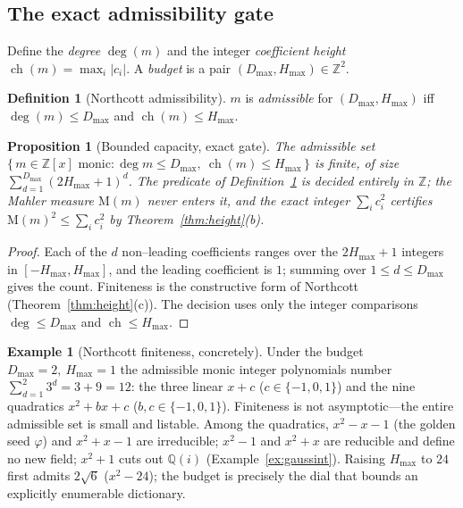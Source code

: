 \documentclass[11pt]{article}
\theoremstyle{plain}
\newtheorem{proposition}[theorem]{Proposition}
\theoremstyle{definition}
\newtheorem{definition}[theorem]{Definition}
\newtheorem{example}[theorem]{Example}
\theoremstyle{remark}
\newcommand{\Q}{\mathbb{Q}}
\newcommand{\Z}{\mathbb{Z}}
\newcommand{\Mah}{\mathrm{M}}
\begin{document}
\subsection{The exact admissibility gate}
Define the \emph{degree} $\deg(m)$ and the integer \emph{coefficient height}
$\operatorname{ch}(m)=\max_i|c_i|$. A \emph{budget} is a pair $(D_{\max},H_{\max})\in\Z^2$.

\begin{definition}[Northcott admissibility]\label{def:admissible}
$m$ is \emph{admissible} for $(D_{\max},H_{\max})$ iff $\deg(m)\le D_{\max}$ and
$\operatorname{ch}(m)\le H_{\max}$.
\end{definition}

\begin{proposition}[Bounded capacity, exact gate]\label{prop:cap}
The admissible set $\{\,m\in\Z[x]\text{ monic}: \deg m\le D_{\max},\ \operatorname{ch}(m)\le H_{\max}\,\}$ is
finite, of size $\sum_{d=1}^{D_{\max}}(2H_{\max}+1)^{d}$. The predicate of
Definition~\ref{def:admissible} is decided entirely in $\Z$; the Mahler measure $\Mah(m)$ never enters it,
and the exact integer $\sum_i c_i^2$ certifies $\Mah(m)^2\le\sum_i c_i^2$ by Theorem~\ref{thm:height}(b).
\end{proposition}
\begin{proof}
Each of the $d$ non--leading coefficients ranges over the $2H_{\max}+1$ integers in
$[-H_{\max},H_{\max}]$, and the leading coefficient is $1$; summing over $1\le d\le D_{\max}$ gives the count.
Finiteness is the constructive form of Northcott (Theorem~\ref{thm:height}(c)). The decision uses only the
integer comparisons $\deg\le D_{\max}$ and $\operatorname{ch}\le H_{\max}$.
\end{proof}

\begin{example}[Northcott finiteness, concretely]\label{ex:northcott}
Under the budget $D_{\max}=2,\ H_{\max}=1$ the admissible monic integer polynomials number
$\sum_{d=1}^{2}3^{d}=3+9=12$: the three linear $x+c$ ($c\in\{-1,0,1\}$) and the nine quadratics $x^2+bx+c$
($b,c\in\{-1,0,1\}$). Finiteness is not asymptotic---the entire admissible set is small and listable. Among
the quadratics, $x^2-x-1$ (the golden seed $\varphi$) and $x^2+x-1$ are irreducible; $x^2-1$ and $x^2+x$ are
reducible and define no new field; $x^2+1$ cuts out $\Q(i)$ (Example~\ref{ex:gaussint}). Raising $H_{\max}$
to $24$ first admits $2\sqrt6$ ($x^2-24$); the budget is precisely the dial that bounds an explicitly
enumerable dictionary.
\end{example}
\end{document}
